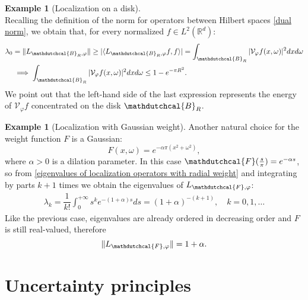 \documentclass[corpo=11pt, stile=classica, tipotesi=custom,
greek, evenboxes, english]{toptesi}
\numberwithin{equation}{chapter}
\theoremstyle{definition}
\newtheorem{es}[teo]{Example}
\theoremstyle{remark}
\newcommand{\R}{\mathbb{R}} %
\newcommand{\V}{\mathcal{V}} %
\begin{document}
\begin{es}[Localization on a disk]
\begin{equation*}
	\end{equation*}
	Recalling the definition of the norm for operators between Hilbert spaces \ref{dual norm}, we obtain that, for every normalized $f \in L^2(\R^d)$:
	\begin{align}\label{bound norm localization on a disk}
			\lambda_0 &= \|L_{\mathdutchcal{B}_R,\varphi} \| \geq |\langle L_{\mathdutchcal{B}_R,\varphi} f, f \rangle | = \int_{\mathdutchcal{B}_R} |\V_{\varphi} f(x,\omega) |^2 dx d\omega \nonumber \\
			&\implies  \int_{\mathdutchcal{B}_R} |\V_{\varphi} f(x,\omega) |^2 dx d\omega\leq 1 - e^{-\pi R^2}.
	\end{align}
	We point out that the left-hand side of the last expression represents the energy of $\V_{\varphi} f$ concentrated on the disk $\mathdutchcal{B}_R$. 
\end{es}

\begin{es}[Localization with Gaussian weight]
	Another natural choice for the weight function $F$ is a Gaussian:
	\begin{equation*}
		F(x,\omega) = e^{-\alpha \pi (x^2 + \omega^2)},
	\end{equation*}
	where $\alpha > 0$ is a dilation parameter. In this case $\mathdutchcal{F}(\frac{s}{\pi}) = e^{-\alpha s}$, so from \eqref{eigenvalues of localization operators with radial weight} and integrating by parts $k+1$ times we obtain the eigenvalues of $L_{\mathdutchcal{F},\varphi}$:
	\begin{align*}
		\lambda_k = \dfrac{1}{k!} \int_0^{+\infty} s^k e^{-(1+\alpha)s}ds = (1+\alpha)^{-(k+1)}, \quad k=0,1,\ldots
	\end{align*}
	Like the previous case, eigenvalues are already ordered in decreasing order and $F$ is still real-valued, therefore
	\begin{equation*}
		\|L_{\mathdutchcal{F},\varphi}\| = 1+\alpha.
	\end{equation*}
\end{es}



\chapter{Uncertainty principles}\label{chapter uncertainty principles}
\end{document}
